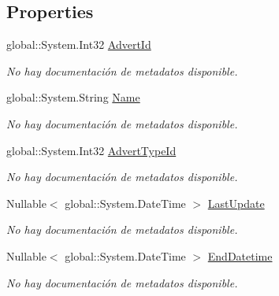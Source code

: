 \subsection*{Properties}
\begin{DoxyCompactItemize}
\item 
global\-::\-System.\-Int32 \hyperlink{class_game_memory_1_1_adverts_ae0e7ff2ba8cd7a48717cd4b26a7927f1}{Advert\-Id}
\begin{DoxyCompactList}\small\item\em No hay documentación de metadatos disponible. \end{DoxyCompactList}\item 
global\-::\-System.\-String \hyperlink{class_game_memory_1_1_adverts_a71dad8d0f7b7aa11e38a2f85a15615f3}{Name}
\begin{DoxyCompactList}\small\item\em No hay documentación de metadatos disponible. \end{DoxyCompactList}\item 
global\-::\-System.\-Int32 \hyperlink{class_game_memory_1_1_adverts_a8c76ff553e2ab7355a2a470325146cff}{Advert\-Type\-Id}
\begin{DoxyCompactList}\small\item\em No hay documentación de metadatos disponible. \end{DoxyCompactList}\item 
Nullable$<$ global\-::\-System.\-Date\-Time $>$ \hyperlink{class_game_memory_1_1_adverts_a25bc849ff293d51367af7f4a00da7c63}{Last\-Update}
\begin{DoxyCompactList}\small\item\em No hay documentación de metadatos disponible. \end{DoxyCompactList}\item 
Nullable$<$ global\-::\-System.\-Date\-Time $>$ \hyperlink{class_game_memory_1_1_adverts_a21ad5dcffdf8c9b233901c6b55197e48}{End\-Datetime}
\begin{DoxyCompactList}\small\item\em No hay documentación de metadatos disponible. \end{DoxyCompactList}\item 

\end{DoxyCompactItemize}
